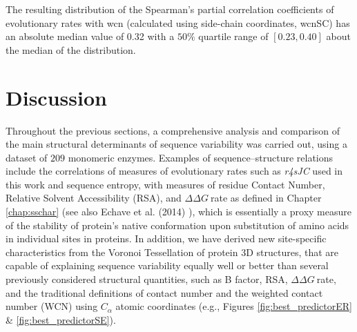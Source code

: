 \documentclass[11pt]{article}
\newcommand{\ddg}{$\Delta\Delta G~$}
\begin{document}
    The resulting distribution of the Spearman's partial correlation coefficients of evolutionary rates with wcn (calculated using side-chain coordinates, wcnSC) has an absolute median value of 0.32 with a $50\%$ quartile range of $[0.23,0.40]$ about the median of the distribution.

    
\section{Discussion}
\label{sec:discussion}

    Throughout the previous sections,  a comprehensive analysis and comparison of the main structural determinants of sequence variability was carried out, using a dataset of $209$ monomeric enzymes. Examples of sequence--structure relations include the correlations of measures of evolutionary rates such as {\it r4sJC} used in this work and sequence entropy, with measures of residue Contact Number, Relative Solvent Accessibility (RSA), and \ddg rate as defined in Chapter \ref{chap:sschar} (see also Echave et al. (2014) \cite{echave_relationship_2014}), which is essentially a proxy measure of the stability of protein's native conformation upon substitution of amino acids in individual sites in proteins. In addition, we have derived new site-specific characteristics from the Voronoi Tessellation of protein 3D structures, that are capable of explaining sequence variability equally well or better than several previously considered structural quantities, such as B factor, RSA, \ddg rate, and the traditional definitions of contact number and the weighted contact number (WCN) using $C_\alpha$ atomic coordinates (e.g., Figures \ref{fig:best_predictorER} \& \ref{fig:best_predictorSE}).
\end{document}
